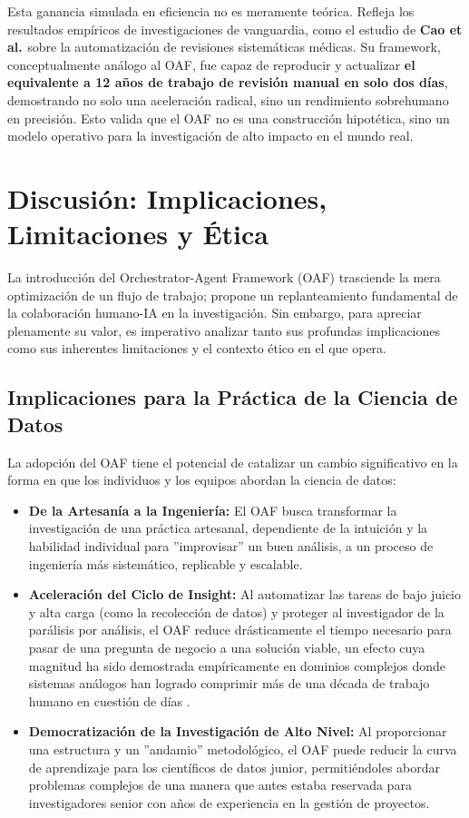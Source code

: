 \documentclass[11pt, a4paper]{article}
\begin{document}
Esta ganancia simulada en eficiencia no es meramente teórica. Refleja los resultados empíricos de investigaciones de vanguardia, como el estudio de \textbf{Cao et al. \cite{cao2025}} sobre la automatización de revisiones sistemáticas médicas. Su framework, conceptualmente análogo al OAF, fue capaz de reproducir y actualizar \textbf{el equivalente a 12 años de trabajo de revisión manual en solo dos días}, demostrando no solo una aceleración radical, sino un rendimiento sobrehumano en precisión. Esto valida que el OAF no es una construcción hipotética, sino un modelo operativo para la investigación de alto impacto en el mundo real.

\section{Discusión: Implicaciones, Limitaciones y Ética}
\label{sec:discusion}

La introducción del Orchestrator-Agent Framework (OAF) trasciende la mera optimización de un flujo de trabajo; propone un replanteamiento fundamental de la colaboración humano-IA en la investigación. Sin embargo, para apreciar plenamente su valor, es imperativo analizar tanto sus profundas implicaciones como sus inherentes limitaciones y el contexto ético en el que opera.

\subsection{Implicaciones para la Práctica de la Ciencia de Datos}
La adopción del OAF tiene el potencial de catalizar un cambio significativo en la forma en que los individuos y los equipos abordan la ciencia de datos:
\begin{itemize}
    \item \textbf{De la Artesanía a la Ingeniería:} El OAF busca transformar la investigación de una práctica artesanal, dependiente de la intuición y la habilidad individual para ''improvisar'' un buen análisis, a un proceso de ingeniería más sistemático, replicable y escalable.
    
    \item \textbf{Aceleración del Ciclo de Insight:} Al automatizar las tareas de bajo juicio y alta carga (como la recolección de datos) y proteger al investigador de la parálisis por análisis, el OAF reduce drásticamente el tiempo necesario para pasar de una pregunta de negocio a una solución viable, un efecto cuya magnitud ha sido demostrada empíricamente en dominios complejos donde sistemas análogos han logrado comprimir más de una década de trabajo humano en cuestión de días \cite{cao2025}.
    
    \item \textbf{Democratización de la Investigación de Alto Nivel:} Al proporcionar una estructura y un ''andamio'' metodológico, el OAF puede reducir la curva de aprendizaje para los científicos de datos junior, permitiéndoles abordar problemas complejos de una manera que antes estaba reservada para investigadores senior con años de experiencia en la gestión de proyectos.
\end{itemize}
\end{document}
